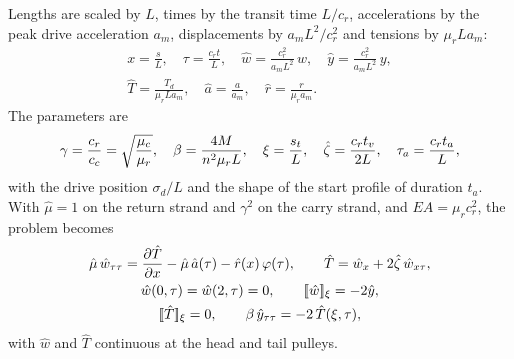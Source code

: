 Lengths are scaled by $L$, times by the transit time $L/c_r$, accelerations by the peak
drive acceleration $a_m$, displacements by $a_mL^2/c_r^2$ and tensions by $\mu_rLa_m$:
\begin{equation}\label{eq:scales}
\begin{gathered}
  x=\frac{s}{L},\quad \tau=\frac{c_rt}{L},\quad
  \hat w=\frac{c_r^2}{a_mL^2}\,w,\quad \hat y=\frac{c_r^2}{a_mL^2}\,y,\\
  \hat T=\frac{T_d}{\mu_rLa_m},\quad \hat a=\frac{a}{a_m},\quad
  \hat r=\frac{r}{\mu_ra_m}.
\end{gathered}
\end{equation}
The parameters are
\begin{equation}\label{eq:params}
  \gamma=\frac{c_r}{c_c}=\sqrt{\frac{\mu_c}{\mu_r}},\quad
  \beta=\frac{4M}{n^2\mu_rL},\quad
  \xi=\frac{s_t}{L},\quad
  \hat\zeta=\frac{c_rt_v}{2L},\quad
  \tau_a=\frac{c_rt_a}{L},
\end{equation}
with the drive position $\sigma_d/L$ and the shape of the start profile of duration $t_a$.
With $\hat\mu=1$ on the return strand and $\gamma^2$ on the carry strand, and $EA=\mu_rc_r^2$,
the problem becomes
\begin{gather}
  \hat\mu\,\hat w_{\tau\tau}=\frac{\partial\hat T}{\partial x}-\hat\mu\,\hat a(\tau)
  -\hat r(x)\,\varphi(\tau),\qquad \hat T=\hat w_x+2\hat\zeta\,\hat w_{x\tau},\label{eq:pde_nd}\\
  \hat w(0,\tau)=\hat w(2,\tau)=0,\qquad \jump{\hat w}_\xi=-2\hat y,\notag\\
  \jump{\hat T}_\xi=0,\qquad \beta\,\hat y_{\tau\tau}=-2\,\hat T(\xi,\tau),\label{eq:bc_nd}
\end{gather}
with $\hat w$ and $\hat T$ continuous at the head and tail pulleys.
